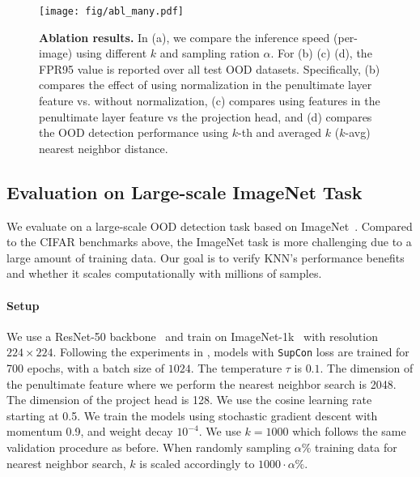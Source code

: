 \documentclass[nohyperref]{article}
\newcommand{\method}{{KNN}}
\theoremstyle{plain}
\theoremstyle{definition}
\theoremstyle{remark}
\begin{document}
\begin{figure*}[t]
\begin{center}
		\texttt{[image: fig/abl\_many.pdf]}
	\end{center}
\caption{\small  \textbf{Ablation results.} In (a), we compare the inference speed (per-image) using different $k$ and sampling ration $\alpha$. For (b) (c) (d), the FPR95 value is reported over all test OOD datasets. Specifically, (b) compares the effect of using normalization in the penultimate layer feature vs. without normalization, (c) compares using features in the penultimate layer feature vs the projection head, and (d) compares the OOD detection performance using  $k$-th and averaged $k$ ($k$-avg) nearest neighbor distance. }
	\label{fig:abl_many}
\end{figure*} 





\subsection{Evaluation on Large-scale ImageNet Task}
\label{sec:imagenet}


We evaluate on a large-scale OOD detection task based on ImageNet~\citep{deng2009imagenet}. Compared to the CIFAR benchmarks above, the ImageNet task is more challenging due to a large amount of training data. Our goal is to verify \method's performance benefits and whether it scales computationally with millions of samples.


\paragraph{Setup} We use a ResNet-50 backbone~\citep{he2016identity} and train on ImageNet-1k~\citep{deng2009imagenet} with resolution $224 \times 224$. Following the experiments in \citeauthor{2020supcon}, models with \texttt{SupCon} loss are trained for 700 epochs, with a batch size of $1024$. The temperature $\tau$ is $0.1$. The dimension of the penultimate feature where we perform the nearest neighbor search is 2048. The dimension of the project head is 128. We use the cosine learning rate~\citep{loshchilov2016sgdr} starting at 0.5. We train the models using stochastic gradient descent with momentum 0.9, and weight decay  $10^{-4}$. We use $k=1000$ which follows the same validation procedure as before. When randomly sampling $\alpha\%$ training data for nearest neighbor search, $k$  is scaled accordingly to $1000 \cdot \alpha\%$.
\end{document}
